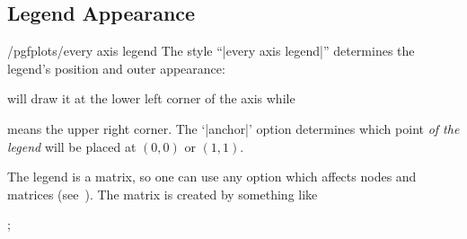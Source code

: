 \subsection{Legend Appearance}

{%

\begin{stylekey}{/pgfplots/every axis legend}
    The style ``|every axis legend|'' determines the legend's position and
    outer appearance:
\begin{codeexample}
\end{codeexample}
    will draw it at the lower left corner of the axis while
\begin{codeexample}
\end{codeexample}
    means the upper right corner. The `|anchor|' option determines which point
    \emph{of the legend} will be placed at $(0,0)$ or $(1,1)$.

    The legend is a \Tikz{} matrix, so one can use any \Tikz{} option which
    affects nodes and matrices (see~\cite[Chapters~13 and 14]{tikz}). The
    matrix is created by something like
\begin{codeexample}
;
\end{codeexample}

\begin{codeexample}[]
\end{codeexample}


\end{stylekey}}
